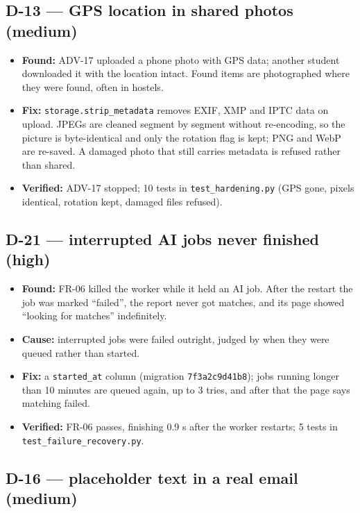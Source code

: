 \subsection{D-13 — GPS location in shared photos (medium)}

\begin{itemize}
\item \textbf{Found:} ADV-17 uploaded a phone photo with GPS data; another student downloaded it with the location intact. Found items are photographed where they were found, often in hostels.
\item \textbf{Fix:} \texttt{storage.\allowbreak{}strip\_\allowbreak{}metadata} removes EXIF, XMP and IPTC data on upload. JPEGs are cleaned segment by segment without re-encoding, so the picture is byte-identical and only the rotation flag is kept; PNG and WebP are re-saved. A damaged photo that still carries metadata is refused rather than shared.
\item \textbf{Verified:} ADV-17 stopped; 10 tests in \texttt{test\_\allowbreak{}hardening.\allowbreak{}py} (GPS gone, pixels identical, rotation kept, damaged files refused).
\end{itemize}

\subsection{D-21 — interrupted AI jobs never finished (high)}

\begin{itemize}
\item \textbf{Found:} FR-06 killed the worker while it held an AI job. After the restart the job was marked “failed”, the report never got matches, and its page showed “looking for matches” indefinitely.
\item \textbf{Cause:} interrupted jobs were failed outright, judged by when they were queued rather than started.
\item \textbf{Fix:} a \texttt{started\_\allowbreak{}at} column (migration \texttt{7f3a2c9d41b8}); jobs running longer than 10 minutes are queued again, up to 3 tries, and after that the page says matching failed.
\item \textbf{Verified:} FR-06 passes, finishing 0.9 s after the worker restarts; 5 tests in \texttt{test\_\allowbreak{}failure\_\allowbreak{}recovery.\allowbreak{}py}.
\end{itemize}

\subsection{D-16 — placeholder text in a real email (medium)}

